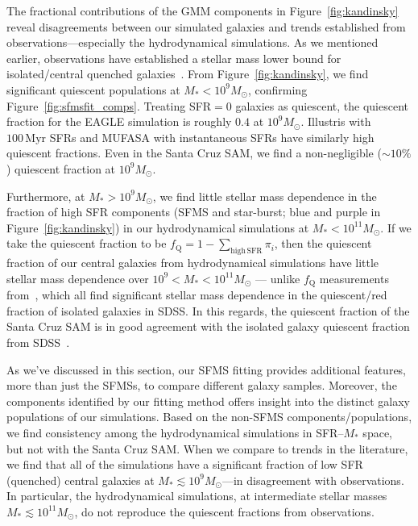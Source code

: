 \documentclass[preprint2,tighten]{aastex62}
\begin{document}
The fractional contributions of the GMM components in Figure~\ref{fig:kandinsky}
reveal disagreements between our simulated galaxies and trends established
from observations---especially the hydrodynamical simulations. As we 
mentioned earlier, observations have established a stellar mass lower bound 
for isolated/central quenched galaxies~\citep{geha2012}. From Figure~\ref{fig:kandinsky}, 
we find significant quiescent populations at $M_* < 10^9 M_\odot$, confirming 
Figure~\ref{fig:sfmsfit_comps}. Treating SFR$=0$ galaxies as quiescent, the quiescent 
fraction for the EAGLE simulation is roughly $0.4$ at $10^9M_\odot$. 
Illustris with $100\,\mathrm{Myr}$ SFRs and MUFASA with instantaneous SFRs
have similarly high quiescent fractions. Even in the Santa Cruz SAM, we 
find a non-negligible ($\sim 10\%$) quiescent fraction at $10^9M_\odot$. 

Furthermore, at $M_* > 10^9M_\odot$, we find little stellar mass dependence in the 
fraction of high SFR components (SFMS and star-burst; blue and purple 
in Figure~\ref{fig:kandinsky}) in our hydrodynamical simulations at 
$M_* < 10^{11}M_\odot$. If we take the quiescent fraction to be 
$f_\mathrm{Q} = 1 - \sum_{\mathrm{high\,SFR}} \pi_i$, then the 
quiescent fraction of our central galaxies from hydrodynamical simulations 
have little stellar mass dependence over $10^9 < M_* < 10^{11} M_\odot$ ---
unlike $f_\mathrm{Q}$ measurements from~\cite{baldry2006,peng2010,hahn2015},
which all find significant stellar mass dependence in the quiescent/red fraction of 
isolated galaxies in SDSS. In this regards, the quiescent fraction of the 
Santa Cruz SAM is in good agreement with the isolated galaxy 
quiescent fraction from SDSS~\citep{baldry2006,peng2010,hahn2015}.

As we've discussed in this section, our SFMS fitting provides additional 
features, more than just the SFMSs, to compare different galaxy samples.
Moreover, the components identified by our fitting method offers insight
into the distinct galaxy populations of our simulations. Based on the 
non-SFMS components/populations, we find consistency among the hydrodynamical
simulations in SFR--$M_*$ space, but not with the Santa Cruz SAM. When we
compare to trends in the literature, we find that all of the simulations 
have a significant fraction of low SFR (quenched) central galaxies at 
$M_* \lesssim 10^9M_\odot$---in disagreement with observations. In particular, 
the hydrodynamical simulations, at intermediate stellar masses 
$M_* \lesssim 10^{11}M_\odot$, do not reproduce the quiescent fractions from 
observations. 
\end{document}
